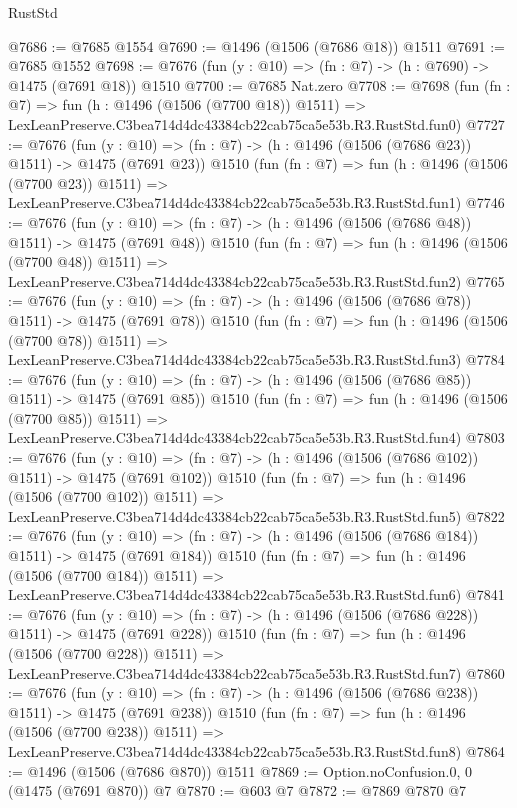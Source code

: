 \begin{lexlean}{RustStd}
\begin{coremodule}
@7686 := @7685 @1554
@7690 := @1496 (@1506 (@7686 @18)) @1511
@7691 := @7685 @1552
@7698 := @7676 (fun (y : @10) => (fn : @7) -> (h : @7690) -> @1475 (@7691 @18)) @1510
@7700 := @7685 Nat.zero
@7708 := @7698
    (fun (fn : @7) =>
    fun (h : @1496 (@1506 (@7700 @18)) @1511) =>
    LexLeanPreserve.C3bea714d4dc43384cb22cab75ca5e53b.R3.RustStd.fun0)
@7727 := @7676
    (fun (y : @10) => (fn : @7) -> (h : @1496 (@1506 (@7686 @23)) @1511) -> @1475 (@7691 @23))
    @1510
    (fun (fn : @7) =>
    fun (h : @1496 (@1506 (@7700 @23)) @1511) =>
    LexLeanPreserve.C3bea714d4dc43384cb22cab75ca5e53b.R3.RustStd.fun1)
@7746 := @7676
    (fun (y : @10) => (fn : @7) -> (h : @1496 (@1506 (@7686 @48)) @1511) -> @1475 (@7691 @48))
    @1510
    (fun (fn : @7) =>
    fun (h : @1496 (@1506 (@7700 @48)) @1511) =>
    LexLeanPreserve.C3bea714d4dc43384cb22cab75ca5e53b.R3.RustStd.fun2)
@7765 := @7676
    (fun (y : @10) => (fn : @7) -> (h : @1496 (@1506 (@7686 @78)) @1511) -> @1475 (@7691 @78))
    @1510
    (fun (fn : @7) =>
    fun (h : @1496 (@1506 (@7700 @78)) @1511) =>
    LexLeanPreserve.C3bea714d4dc43384cb22cab75ca5e53b.R3.RustStd.fun3)
@7784 := @7676
    (fun (y : @10) => (fn : @7) -> (h : @1496 (@1506 (@7686 @85)) @1511) -> @1475 (@7691 @85))
    @1510
    (fun (fn : @7) =>
    fun (h : @1496 (@1506 (@7700 @85)) @1511) =>
    LexLeanPreserve.C3bea714d4dc43384cb22cab75ca5e53b.R3.RustStd.fun4)
@7803 := @7676
    (fun (y : @10) => (fn : @7) -> (h : @1496 (@1506 (@7686 @102)) @1511) -> @1475 (@7691 @102))
    @1510
    (fun (fn : @7) =>
    fun (h : @1496 (@1506 (@7700 @102)) @1511) =>
    LexLeanPreserve.C3bea714d4dc43384cb22cab75ca5e53b.R3.RustStd.fun5)
@7822 := @7676
    (fun (y : @10) => (fn : @7) -> (h : @1496 (@1506 (@7686 @184)) @1511) -> @1475 (@7691 @184))
    @1510
    (fun (fn : @7) =>
    fun (h : @1496 (@1506 (@7700 @184)) @1511) =>
    LexLeanPreserve.C3bea714d4dc43384cb22cab75ca5e53b.R3.RustStd.fun6)
@7841 := @7676
    (fun (y : @10) => (fn : @7) -> (h : @1496 (@1506 (@7686 @228)) @1511) -> @1475 (@7691 @228))
    @1510
    (fun (fn : @7) =>
    fun (h : @1496 (@1506 (@7700 @228)) @1511) =>
    LexLeanPreserve.C3bea714d4dc43384cb22cab75ca5e53b.R3.RustStd.fun7)
@7860 := @7676
    (fun (y : @10) => (fn : @7) -> (h : @1496 (@1506 (@7686 @238)) @1511) -> @1475 (@7691 @238))
    @1510
    (fun (fn : @7) =>
    fun (h : @1496 (@1506 (@7700 @238)) @1511) =>
    LexLeanPreserve.C3bea714d4dc43384cb22cab75ca5e53b.R3.RustStd.fun8)
@7864 := @1496 (@1506 (@7686 @870)) @1511
@7869 := Option.noConfusion.{0, 0} (@1475 (@7691 @870)) @7
@7870 := @603 @7
@7872 := @7869 @7870 @7

\end{coremodule}
\end{lexlean}
